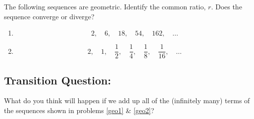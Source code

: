 The following sequences are geometric. Identify the common ratio, \(r\). Does the sequence converge or diverge?
\begin{enumerate}
\addtocounter{enumi}{4}
\item
 \[
2, \quad 6, \quad 18, \quad 54, \quad 162, \quad \ldots
\] \label{geo1}

\item
\[
2, \quad 1, \quad \frac{1}{2}, \quad \frac{1}{4}, \quad \frac{1}{8}, \quad \frac{1}{16}, \quad \ldots
\]\label{geo2}




\end{enumerate}

\vfill

\subsection*{Transition Question:}
What do you think will happen if we add up all of the (infinitely many) terms of the sequences shown in problems \ref{geo1} \& \ref{geo2}? 


%
%



